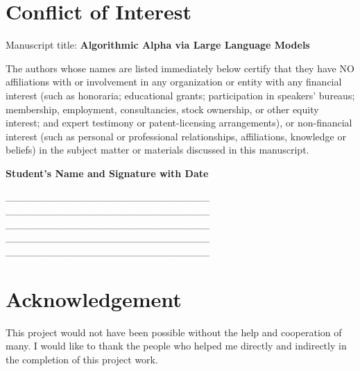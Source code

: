 \documentclass[12pt, a4paper]{report}
\begin{document}
\newpage
\chapter*{Conflict of Interest}

Manuscript title: \textbf{Algorithmic Alpha via Large Language Models}

The authors whose names are listed immediately below certify that they have NO affiliations with or involvement in any organization or entity with any financial interest (such as honoraria; educational grants; participation in speakers’ bureaus; membership, employment, consultancies, stock ownership, or other equity interest; and expert testimony or patent-licensing arrangements), or non-financial interest (such as personal or professional relationships, affiliations, knowledge or beliefs) in the subject matter or materials discussed in this manuscript.

\vspace{2cm}
\noindent \textbf{Student’s Name and Signature with Date}


\vspace{1cm}
\noindent \_\_\_\_\_\_\_\_\_\_\_\_\_\_\_\_\_\_\_\_\_\_\_\_\_\_\_\_  \\

\noindent  \_\_\_\_\_\_\_\_\_\_\_\_\_\_\_\_\_\_\_\_\_\_\_\_\_\_\_\_  \\

\noindent \_\_\_\_\_\_\_\_\_\_\_\_\_\_\_\_\_\_\_\_\_\_\_\_\_\_\_\_  \\

\noindent  \_\_\_\_\_\_\_\_\_\_\_\_\_\_\_\_\_\_\_\_\_\_\_\_\_\_\_\_  \\

\noindent  \_\_\_\_\_\_\_\_\_\_\_\_\_\_\_\_\_\_\_\_\_\_\_\_\_\_\_\_  \\



\newpage
\chapter*{Acknowledgement}

This project would not have been possible without the help and cooperation of many. I would like to thank the people who helped me directly and indirectly in the completion of this project work.
\end{document}
